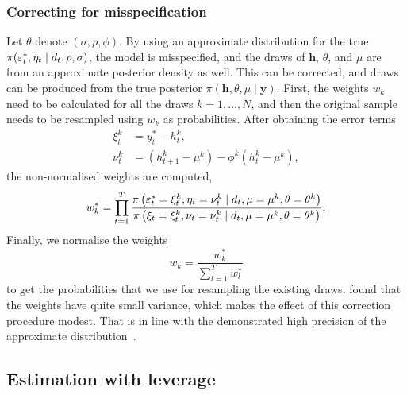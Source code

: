 \subsubsection{Correcting for misspecification}\label{sec:reweight}

Let $\theta$ denote $(\sigma,\rho,\phi)$.
By using an approximate distribution for the true $\pi(\varepsilon_t^\ast,\eta_t\mid d_t,\rho,\sigma)$, the model is misspecified, and the draws of $\bm{h}$, $\theta$, and $\mu$ are from an approximate posterior density as well.
This can be corrected, and draws can be produced from the true posterior $\pi(\bm{h},\theta,\mu\mid\bm{y})$.
First, the weights $w_k$ need to be calculated for all the draws $k=1,\dots,N$, and then the original sample needs to be resampled using $w_k$ as probabilities.
After obtaining the error terms
\begin{align*}
\xi_t^k &= y_t^\ast-h_t^k, \\
\nu_t^k &= (h_{t+1}^k-\mu^k)-\phi^k(h_t^k-\mu^k),
\end{align*}
the non-normalised weights are computed,
\begin{equation*}
w_k^\ast=\prod_{t=1}^{T}\frac{\pi\left(\varepsilon_t^\ast=\xi_t^k,\eta_t=\nu_t^k\mid d_t,\mu=\mu^k,\theta=\theta^k\right)}{\pi\left(\xi_t=\xi_t^k,\nu_t=\nu_t^k\mid d_t,\mu=\mu^k,\theta=\theta^k\right)},
\end{equation*}
Finally, we normalise the weights
\begin{equation*}
w_k=\frac{w_k^\ast}{\sum_{l=1}^{T}w_l^\ast}
\end{equation*}
to get the probabilities that we use for resampling the existing draws.
\citet{Omori2007} found that the weights have quite small variance, which makes the effect of this correction procedure modest.
That is in line with the demonstrated high precision of the approximate distribution~\citep{Omori2007}.

\subsection{Estimation with leverage}\label{sec:estimlev}

